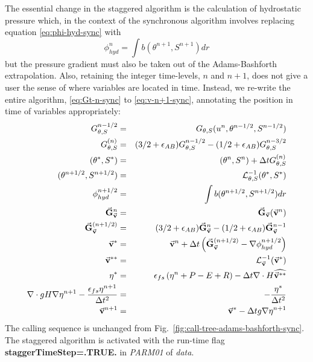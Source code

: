The essential change in the staggered algorithm is the calculation of
hydrostatic pressure which, in the context of the synchronous
algorithm involves replacing equation \ref{eq:phi-hyd-sync} with
\begin{displaymath}
\phi_{hyd}^n = \int b(\theta^{n+1},S^{n+1}) dr
\end{displaymath}
but the pressure gradient must also be taken out of the
Adams-Bashforth extrapolation. Also, retaining the integer time-levels,
$n$ and $n+1$, does not give a user the sense of where variables are
located in time.  Instead, we re-write the entire algorithm,
\ref{eq:Gt-n-sync} to \ref{eq:v-n+1-sync}, annotating the
position in time of variables appropriately:
\begin{eqnarray}
G_{\theta,S}^{n-1/2} & = & G_{\theta,S} ( u^n, \theta^{n-1/2}, S^{n-1/2} )
\label{eq:Gt-n-staggered} \\
G_{\theta,S}^{(n)} & = & (3/2+\epsilon_{AB}) G_{\theta,S}^{n-1/2}-(1/2+\epsilon_{AB}) G_{\theta,S}^{n-3/2}
\label{eq:Gt-n+5-staggered} \\
(\theta^*,S^*) & = & (\theta^{n},S^{n}) + \Delta t G_{\theta,S}^{(n)}
\label{eq:tstar-staggered} \\
(\theta^{n+1/2},S^{n+1/2}) & = & {\cal L}^{-1}_{\theta,S} (\theta^*,S^*)
\label{eq:t-n+1-staggered} \\
\phi^{n+1/2}_{hyd} & = & \int b(\theta^{n+1/2},S^{n+1/2}) dr
\label{eq:phi-hyd-staggered} \\
\vec{\bf G}_{\vec{\bf v}}^{n} & = & \vec{\bf G}_{\vec{\bf v}} ( \vec{\bf v}^n )
\label{eq:Gv-n-staggered} \\
\vec{\bf G}_{\vec{\bf v}}^{(n+1/2)} & = & (3/2 + \epsilon_{AB} ) \vec{\bf G}_{\vec{\bf v}}^{n} - (1/2 + \epsilon_{AB} ) \vec{\bf G}_{\vec{\bf v}}^{n-1}
\label{eq:Gv-n+5-staggered} \\
\vec{\bf v}^{*} & = & \vec{\bf v}^{n} + \Delta t \left( \vec{\bf G}_{\vec{\bf v}}^{(n+1/2)} - \nabla \phi_{hyd}^{n+1/2} \right)
\label{eq:vstar-staggered} \\
\vec{\bf v}^{**} & = & {\cal L}_{\vec{\bf v}}^{-1} ( \vec{\bf v}^* )
\label{eq:vstarstar-staggered} \\
\eta^* & = & \epsilon_{fs} \left( \eta^{n} +P-E+R \right)- \Delta t 
  \nabla \cdot H \widehat{ \vec{\bf v}^{**} }
\label{eq:nstar-staggered} \\
\nabla \cdot g H \nabla \eta^{n+1} - \frac{\epsilon_{fs} \eta^{n+1}}{\Delta t^2}
& = & - \frac{\eta^*}{\Delta t^2}
\label{eq:elliptic-staggered} \\
\vec{\bf v}^{n+1} & = & \vec{\bf v}^{*} - \Delta t g \nabla \eta^{n+1}
\label{eq:v-n+1-staggered}
\end{eqnarray}
The calling sequence is unchanged from
Fig.~\ref{fig:call-tree-adams-bashforth-sync}. The staggered algorithm
is activated with the run-time flag {\bf staggerTimeStep=.TRUE.} in
{\em PARM01} of {\em data}.

